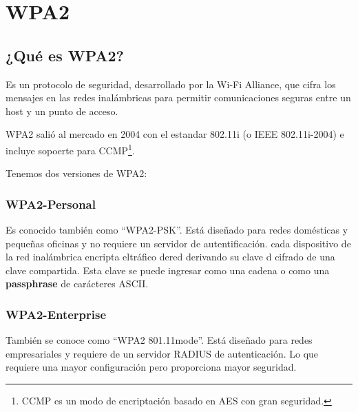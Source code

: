 \chapter{WPA2}
\section{¿Qué es WPA2?} %
Es un protocolo de seguridad, desarrollado por la Wi-Fi Alliance, que cifra los mensajes en las redes inalámbricas para permitir comunicaciones seguras entre un host y un punto de acceso.

WPA2 salió al mercado en 2004 con el estandar 802.11i (o IEEE 802.11i-2004) e incluye sopoerte para CCMP\footnote{CCMP es un modo de encriptación basado en AES con gran seguridad.}.


Tenemos dos versiones de WPA2:

\subsection{WPA2-Personal} %
Es conocido también como ``WPA2-PSK''. Está diseñado para redes domésticas y pequeñas oficinas y no requiere un servidor de autentificación. cada dispositivo de la red inalámbrica encripta eltráfico dered derivando su clave d cifrado de una clave compartida. Esta clave se puede ingresar como una cadena o como una \textbf{passphrase} de carácteres ASCII.

\subsection{WPA2-Enterprise} %
También se conoce como ``WPA2 801.11mode''. Está diseñado para redes empresariales y requiere de un servidor RADIUS de autenticación. Lo que requiere una mayor configuración pero proporciona mayor seguridad.

